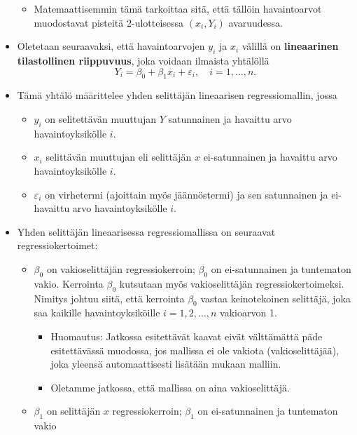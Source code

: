 \documentclass[
]{book}
\providecommand{\tightlist}{%
  \setlength{\itemsep}{0pt}\setlength{\parskip}{0pt}}
\begin{document}
\begin{itemize}
  \begin{itemize}
  \tightlist
  \item
    Matemaattisemmin tämä tarkoittaa sitä, että tällöin havaintoarvot muodostavat pisteitä 2-ulotteisessa \((x_i, Y_i)\) avaruudessa.
  \end{itemize}
\item
  Oletetaan seuraavaksi, että havaintoarvojen \(y_i\) ja \(x_i\) välillä on \textbf{lineaarinen tilastollinen riippuvuus}, joka voidaan ilmaista yhtälöllä
  \[
  Y_i = \beta_0 + \beta_1 x_i + \varepsilon_i, \quad i=1,\ldots, n.
  \]
\item
  Tämä yhtälö määrittelee yhden selittäjän lineaarisen regressiomallin, jossa

  \begin{itemize}
  \tightlist
  \item
    \(y_i\) on selitettävän muuttujan \(Y\) satunnainen ja havaittu arvo havaintoyksikölle \(i\).
  \item
    \(x_i\) selittävän muuttujan eli selittäjän \(x\) ei-satunnainen ja havaittu arvo havaintoyksikölle \(i\).
  \item
    \(\varepsilon_i\) on virhetermi (ajoittain myös jäännöstermi) ja sen satunnainen ja ei-havaittu arvo havaintoyksikölle \(i\).
  \end{itemize}
\item
  Yhden selittäjän lineaarisessa regressiomallissa on seuraavat regressiokertoimet:

  \begin{itemize}
  \tightlist
  \item
    \(\beta_0\) on vakioselittäjän regressiokerroin; \(\beta_0\) on ei-satunnainen ja tuntematon vakio. Kerrointa \(\beta_0\) kutsutaan myös vakioselittäjän regressiokertoimeksi. Nimitys johtuu siitä, että kerrointa \(\beta_0\) vastaa keinotekoinen selittäjä, joka saa kaikille havaintoyksiköille \(i=1, 2, \ldots, n\) vakioarvon 1.

    \begin{itemize}
    \tightlist
    \item
      Huomautus: Jatkossa esitettävät kaavat eivät välttämättä päde esitettävässä muodossa, jos mallissa ei ole vakiota (vakioselittäjää), joka yleensä automaattisesti lisätään mukaan malliin.
    \item
      Oletamme jatkossa, että mallissa on aina vakioselittäjä.
    \end{itemize}
  \item
    \(\beta_1\) on selittäjän \(x\) regressiokerroin; \(\beta_1\) on ei-satunnainen ja tuntematon vakio


\end{itemize}
\end{itemize}
\end{document}
